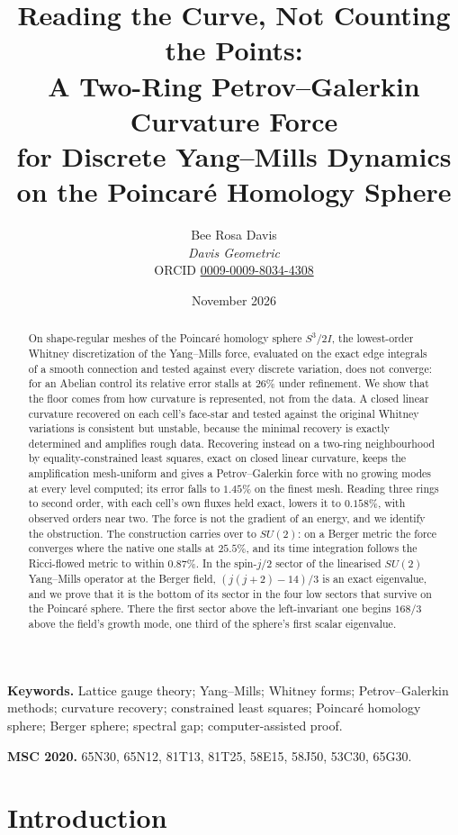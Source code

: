 \documentclass[11pt]{article}
\title{Reading the Curve, Not Counting the Points:\\[2pt]
\large A Two-Ring Petrov--Galerkin Curvature Force\\ for Discrete Yang--Mills Dynamics on the Poincar\'e Homology Sphere}
\author{Bee Rosa Davis\\[1pt] {\normalsize\upshape\itshape Davis Geometric}\\[1pt] {\footnotesize\upshape ORCID \href{https://orcid.org/0009-0009-8034-4308}{0009-0009-8034-4308}}}
\date{November 2026}
\theoremstyle{definition}
\theoremstyle{remark}
\begin{document}
\maketitle

\begin{abstract}
On shape-regular meshes of the Poincar\'e homology sphere $S^3/2I$, the lowest-order Whitney
discretization of the Yang--Mills force, evaluated on the exact edge integrals of a smooth connection
and tested against every discrete variation, does not converge: for an Abelian control its relative
error stalls at $26\%$ under refinement. We show that the floor comes from how curvature is
represented, not from the data. A closed linear curvature recovered on each cell's face-star and tested
against the original Whitney variations is consistent but unstable, because the minimal recovery is
exactly determined and amplifies rough data. Recovering instead on a two-ring neighbourhood by
equality-constrained least squares, exact on closed linear curvature, keeps the amplification
mesh-uniform and gives a Petrov--Galerkin force with no growing modes at every level computed; its
error falls to $1.45\%$ on the finest mesh. Reading three rings to second order, with each cell's own
fluxes held exact, lowers it to $0.158\%$, with observed orders near two. The force is not the
gradient of an energy, and we identify the obstruction. The construction carries over to $SU(2)$: on a Berger metric the force converges where the native one stalls at $25.5\%$, and
its time integration follows the Ricci-flowed metric to within $0.87\%$. In the spin-$j/2$ sector of the linearised $SU(2)$ Yang--Mills operator at the Berger field,
$(j(j+2)-14)/3$ is an exact eigenvalue, and we prove that it is the bottom of its sector in the four low
sectors that survive on the Poincar\'e sphere. There the first sector above the left-invariant one
begins $168/3$ above the field's growth mode, one third of the sphere's first scalar eigenvalue.
\end{abstract}

\noindent\textbf{Keywords.} Lattice gauge theory; Yang--Mills; Whitney forms; Petrov--Galerkin methods;
curvature recovery; constrained least squares; Poincar\'e homology sphere; Berger sphere; spectral
gap; computer-assisted proof.

\noindent\textbf{MSC 2020.} 65N30, 65N12, 81T13, 81T25, 58E15, 58J50, 53C30, 65G30.


\section{Introduction}
\end{document}
